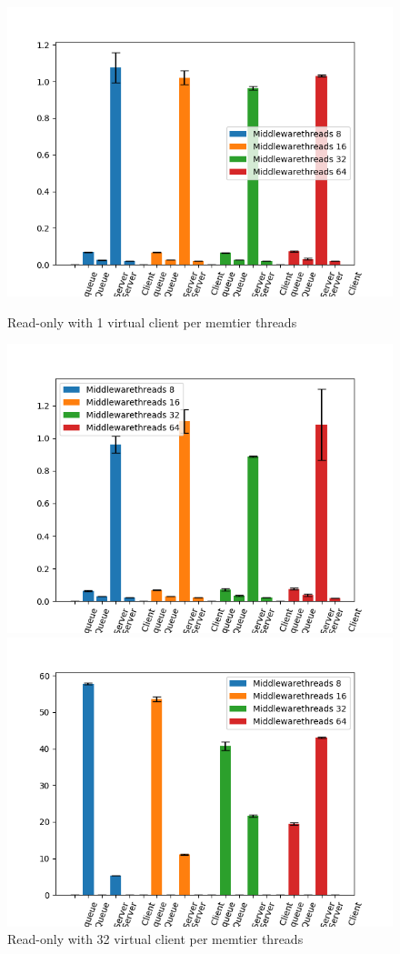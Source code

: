 \documentclass[11pt,a4paper]{article}
\begin{document}
\begin{figure}[H] 
  \label{ fig7} 
  \begin{minipage}[b]{0.45\linewidth}
    \centering
    \includegraphics[width=0.7\linewidth]{img/exp3_2/exp3_2_mw_percentile_plots_writes_0__vc_1.png} 
    \caption{Read-only with 1 virtual client per memtier threads} 
    \vspace{4ex}
  \end{minipage}%
  \begin{minipage}[b]{0.45\linewidth}
    \centering
    \includegraphics[width=0.7\linewidth]{img/exp3_2/exp3_2_mw_percentile_plots_writes_1__vc_1.png} 
    \caption{Read-only with 32 virtual client per memtier threads} 
    \vspace{4ex}
  \end{minipage} 
    \begin{minipage}[b]{0.45\linewidth}
    \centering
    \includegraphics[width=0.7\linewidth]{img/exp3_2/exp3_2_mw_percentile_plots_writes_0__vc_32.png} 

\end{minipage}
\end{figure}
\end{document}
